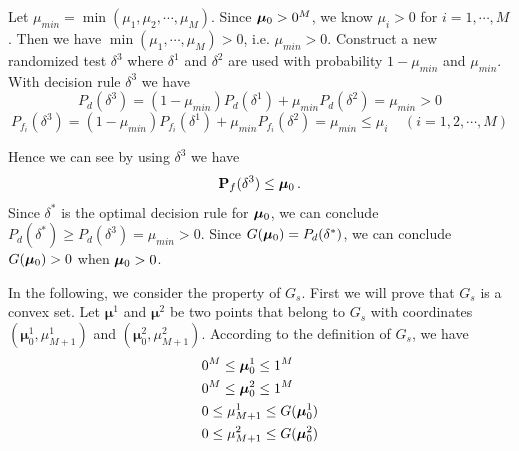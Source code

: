 Let $\mu_{min} = \min(\mu_1, \mu_2, \cdots, \mu_M)$. Since $\boldsymbol{\mu}_0 > 0^M$, we know $\mu_i > 0$ for $i = 1, \cdots, M$. Then we have $\min(\mu_1, \cdots, \mu_M) > 0$, i.e. $\mu_{min} > 0$. Construct a new randomized test $\delta^3$ where $\delta^1$ and $\delta^2$ are used with probability $1 - \mu_{min} $ and $\mu_{min}$. With decision rule $\delta^3$ we have
\begin{equation}
  P_d(\delta^3) = (1 - \mu_{min})P_d(\delta^1) + \mu_{min}P_d(\delta^2) = \mu_{min} > 0
\end{equation}
\begin{equation}
  P_{f_i}(\delta^3) = (1 - \mu_{min})P_{f_i}(\delta^1) + \mu_{min}P_{f_i}(\delta^2) = \mu_{min} \leq \mu_i \;\;\;\;(i = 1, 2, \cdots, M)
\end{equation}

Hence we can see by using $\delta^3$ we have
\[
  \mathbf{P}_f(\delta^3) \leq \boldsymbol{\mu}_0\,.
\]
Since $\delta^\ast $ is the optimal decision rule for $\boldsymbol{\mu}_0$, we can conclude $P_d(\delta^\ast) \geq  P_d(\delta^3) = \mu_{min} >  0$. Since $G(\boldsymbol{\mu}_0) = P_d(\delta^\ast)$, we can conclude $G(\boldsymbol{\mu}_0) > 0$ when $\boldsymbol{\mu}_0 > 0 $. 


In the following, we consider the property of $G_s$. First we will prove that $G_s$ is a convex set. 
Let $\boldsymbol{\mu}^1$ and  $\boldsymbol{\mu}^2$ be two points that belong to $G_s$ with coordinates $(\boldsymbol{\mu}^1_0, \mu_{M+1}^1)$ and $(\boldsymbol{\mu}^2_0, \mu_{M+1}^2)$. According to the definition of $G_s$, we have 
\begin{subequations}
\label{1120t4}
\begin{align}
\label{1120night6}
&0^M \leq \boldsymbol{\mu}_0^1 \leq 1^M\\
\label{1120night7}
&0^M \leq \boldsymbol{\mu}^2_0 \leq 1^M\\
\label{1120night3}
&0 \leq \mu_{M+1}^1 \leq G(\boldsymbol{\mu}_0^1)\\
\label{1120night4}
&0 \leq \mu_{M+1}^2 \leq G(\boldsymbol{\mu}_0^2)
\end{align}
\end{subequations}

